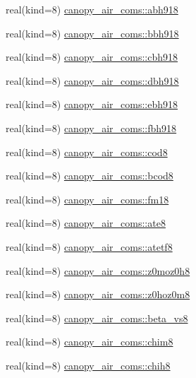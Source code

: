 \begin{DoxyCompactItemize}
real(kind=8) \hyperlink{namespacecanopy__air__coms_a7bbc194838f911d2e8b0948159f4d62e}{canopy\+\_\+air\+\_\+coms\+::abh918}
\item 
real(kind=8) \hyperlink{namespacecanopy__air__coms_a9c6504ecba9e79e8a45ab651e4f333ac}{canopy\+\_\+air\+\_\+coms\+::bbh918}
\item 
real(kind=8) \hyperlink{namespacecanopy__air__coms_af33e7b269902b3016162017330ae0669}{canopy\+\_\+air\+\_\+coms\+::cbh918}
\item 
real(kind=8) \hyperlink{namespacecanopy__air__coms_a63eef048a3bf4e6509c0f27b4fc0ca29}{canopy\+\_\+air\+\_\+coms\+::dbh918}
\item 
real(kind=8) \hyperlink{namespacecanopy__air__coms_a11043a7112de7f9908ed6b300f294de9}{canopy\+\_\+air\+\_\+coms\+::ebh918}
\item 
real(kind=8) \hyperlink{namespacecanopy__air__coms_a47de2ab0746525613b12c27bd8a16fda}{canopy\+\_\+air\+\_\+coms\+::fbh918}
\item 
real(kind=8) \hyperlink{namespacecanopy__air__coms_a552c0a665b038439b55822a43a5c15e2}{canopy\+\_\+air\+\_\+coms\+::cod8}
\item 
real(kind=8) \hyperlink{namespacecanopy__air__coms_a7b5193455d7f0ba7668b3b2f1988f468}{canopy\+\_\+air\+\_\+coms\+::bcod8}
\item 
real(kind=8) \hyperlink{namespacecanopy__air__coms_a544049d4f8f7a8a135df2f0d3105696a}{canopy\+\_\+air\+\_\+coms\+::fm18}
\item 
real(kind=8) \hyperlink{namespacecanopy__air__coms_a896b380af341c4fda227104ec855c42f}{canopy\+\_\+air\+\_\+coms\+::ate8}
\item 
real(kind=8) \hyperlink{namespacecanopy__air__coms_ac0a58110fa129fb929e126e046d2b6fd}{canopy\+\_\+air\+\_\+coms\+::atetf8}
\item 
real(kind=8) \hyperlink{namespacecanopy__air__coms_afdd4c5b670411d96ba77803ed6e7820d}{canopy\+\_\+air\+\_\+coms\+::z0moz0h8}
\item 
real(kind=8) \hyperlink{namespacecanopy__air__coms_ad12ca3c3ffdc40ca14f6a948d27d702a}{canopy\+\_\+air\+\_\+coms\+::z0hoz0m8}
\item 
real(kind=8) \hyperlink{namespacecanopy__air__coms_aa2905dc30dae25c206e6b6a8c0b9fdf8}{canopy\+\_\+air\+\_\+coms\+::beta\+\_\+vs8}
\item 
real(kind=8) \hyperlink{namespacecanopy__air__coms_a3f2a651b7e88c7013170fd87353d321a}{canopy\+\_\+air\+\_\+coms\+::chim8}
\item 
real(kind=8) \hyperlink{namespacecanopy__air__coms_aa048cab087baff380bd240a8318ec8ea}{canopy\+\_\+air\+\_\+coms\+::chih8}

\end{DoxyCompactItemize}
